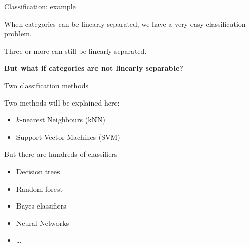 \documentclass[compress]{beamer}
\begin{document}
\begin{frame}{Classification: example}
\begin{center}
{\begin{tikzpicture}[>=latex,
                starmarker/.style={star, fill=hriSec2Comp,opacity=0.5,inner sep=0,minimum size=4pt}]
            \end{tikzpicture}
        }
    \end{center}


     {
        When categories can be linearly separated, we have a very easy
        classification problem.
    }

     {
        Three or more can still be linearly separated.
    }


     {
        \textbf{But what if categories are not linearly separable?}
    }

\end{frame}

\begin{frame}{Two classification methods}

Two methods will be explained here:

\begin{itemize}

\item $k$-nearest Neighbours (kNN)
\item Support Vector Machines (SVM)
\end{itemize}

But there are hundreds of classifiers

\begin{itemize}

\item Decision trees
\item Random forest
\item Bayes classifiers
\item Neural Networks
\item \ldots{}
\end{itemize}

\end{frame}
\end{document}
